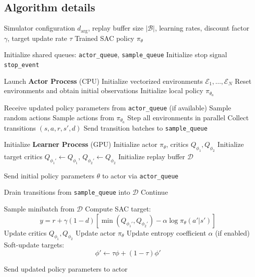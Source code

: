 \documentclass{article}
\begin{document}
\subsection{Algorithm details}
\begin{algorithm}[H]
\caption{Asynchronous SAC with Parallel Environments}
\label{alg:async_sac}
\begin{algorithmic}[1]

\Require Simulator configuration $d_{\text{arg}}$, replay buffer size $|\mathcal{B}|$, learning rates, discount factor $\gamma$, target update rate $\tau$
\Ensure Trained SAC policy $\pi_\theta$

\State Initialize shared queues: \texttt{actor\_queue}, \texttt{sample\_queue}
\State Initialize stop signal \texttt{stop\_event}

\State Launch \textbf{Actor Process} (CPU)
\Statex \quad Initialize vectorized environments $\mathcal{E}_1, \dots, \mathcal{E}_N$
\Statex \quad Reset environments and obtain initial observations
\Statex \quad Initialize local policy $\pi_{\theta_a}$

    \State Receive updated policy parameters from \texttt{actor\_queue} (if available)
        \State Sample random actions
    \Else
        \State Sample actions from $\pi_{\theta_a}$
    \EndIf
    \State Step all environments in parallel
    \State Collect transitions $(s, a, r, s', d)$
    \State Send transition batches to \texttt{sample\_queue}
\EndWhile

\State Initialize \textbf{Learner Process} (GPU)
\State Initialize actor $\pi_\theta$, critics $Q_{\phi_1}, Q_{\phi_2}$
\State Initialize target critics $Q_{\phi_1'} \leftarrow Q_{\phi_1}$, $Q_{\phi_2'} \leftarrow Q_{\phi_2}$
\State Initialize replay buffer $\mathcal{D}$

\State Send initial policy parameters $\theta$ to actor via \texttt{actor\_queue}

    \State Drain transitions from \texttt{sample\_queue} into $\mathcal{D}$
        \State Continue
    \EndIf

            \State Sample minibatch from $\mathcal{D}$
            \State Compute SAC target:
            \[
            y = r + \gamma (1-d) \left[
            \min(Q_{\phi_1'}, Q_{\phi_2'}) - \alpha \log \pi_\theta(a'|s')
            \right]
            \]
            \State Update critics $Q_{\phi_1}, Q_{\phi_2}$
            \State Update actor $\pi_\theta$
            \State Update entropy coefficient $\alpha$ (if enabled)
            \State Soft-update targets:
            \[
            \phi' \leftarrow \tau \phi + (1-\tau)\phi'
            \]
        \EndFor
    \EndFor

        \State Send updated policy parameters to actor
    \EndIf
\EndWhile

\end{algorithmic}
\end{algorithm}
\newpage
\end{document}
